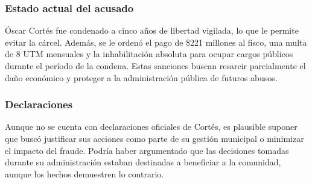 \documentclass[letter,12pt]{article}
\begin{document}
	\subsubsection{Estado actual del acusado}
	Óscar Cortés fue condenado a cinco años de libertad vigilada, lo que le permite evitar la cárcel. Además, se le ordenó el pago de \$221 millones al fisco, una multa de 8 UTM mensuales y la inhabilitación absoluta para ocupar cargos públicos durante el período de la condena. Estas sanciones buscan resarcir parcialmente el daño económico y proteger a la administración pública de futuros abusos.\\
	
	\subsubsection{Declaraciones}
	Aunque no se cuenta con declaraciones oficiales de Cortés, es plausible suponer que buscó justificar sus acciones como parte de su gestión municipal o minimizar el impacto del fraude. Podría haber argumentado que las decisiones tomadas durante su administración estaban destinadas a beneficiar a la comunidad, aunque los hechos demuestren lo contrario.
\end{document}
